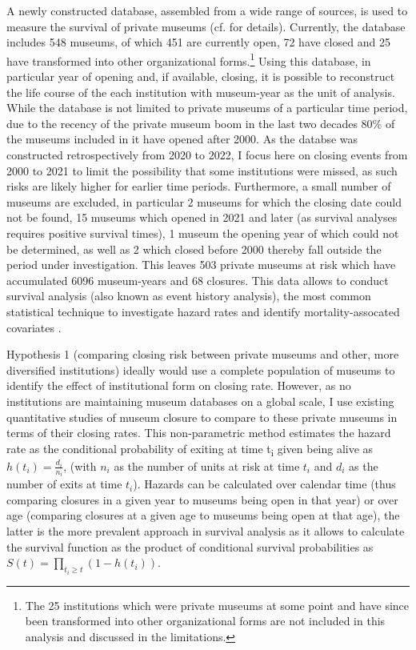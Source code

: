 \documentclass[12pt]{article}
\begin{document}
A newly constructed database, assembled from a wide range of sources, is used to measure the survival of private museums (cf. \textcite{Velthuis_etal_2023_boom} for details).
Currently, the database includes 548 museums, of which 451 are currently open, 72 have closed and 25 have transformed into other organizational forms.\footnote{The 25 institutions which were private museums at some point and have since been transformed into other organizational forms are not included in this analysis and discussed in the limitations.}
Using this database, in particular year of opening and, if available, closing, it is possible to reconstruct the life course of the each institution with museum-year as the unit of analysis.
While the database is not limited to private museums of a particular time period, due to the recency of the private museum boom in the last two decades 80\% of the museums included in it have opened after 2000.
As the databse was constructed retrospectively from 2020 to 2022, I focus here on closing events from 2000 to 2021 to limit the possibility that some institutions were missed, as such risks are likely higher for earlier time periods.
Furthermore, a small number of museums are excluded, in particular 2 museums for which the closing date could not be found, 15 museums which opened in 2021 and later (as survival analyses requires positive survival times), 1 museum the opening year of which could not be determined, as well as 2 which closed before 2000 thereby fall outside the period under investigation.
This leaves 503 private museums at risk which have accumulated 6096 museum-years and 68 closures.
This data allows to conduct survival analysis (also known as event history analysis), the most common statistical technique to investigate hazard rates and identify mortality-assocated covariates \parencite{Moore_2015_survival,Allison_2014_event}.




Hypothesis 1 (comparing closing risk between private museums and other, more diversified institutions) ideally would use a complete population of museums to identify the effect of institutional form on closing rate.
However, as no institutions are maintaining museum databases on a global scale, I use existing quantitative studies of museum closure to compare to these private museums in terms of their closing rates.
This non-parametric method estimates the hazard rate as the conditional probability of exiting at time t\textsubscript{i} given being alive as \(h(t_i) = \frac{d_i}{n_i}\), (with \(n_i\) as the number of units at risk at time \(t_i\) and \(d_i\) as the number of exits at time \(t_i\)).
Hazards can be calculated over calendar time (thus comparing closures in a given year to museums being open in that year) or over age (comparing closures at a given age to museums being open at that age), the latter is the more prevalent approach in survival analysis as it allows to calculate the survival function as the product of conditional survival probabilities as \(S(t) = \prod_{t_i \geq t} \left(1-h(t_i) \right)\).
\end{document}
